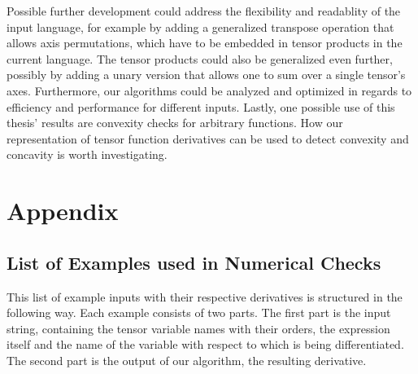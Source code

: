 \documentclass[12pt, a4paper]{report}
\begin{document}
Possible further development could address the flexibility and readablity of the input language, for example by adding a generalized transpose operation that allows axis permutations, which have to be embedded in tensor products in the current language.
The tensor products could also be generalized even further, possibly by adding a unary version that allows one to sum over a single tensor's axes.
Furthermore, our algorithms could be analyzed and optimized in regards to efficiency and performance for different inputs.
Lastly, one possible use of this thesis' results are convexity checks for arbitrary functions.
How our representation of tensor function derivatives can be used to detect convexity and concavity is worth investigating.

\printbibliography
{}

\chapter*{Appendix}
\section*{List of Examples used in Numerical Checks}
This list of example inputs with their respective derivatives is structured in the following way.
Each example consists of two parts.
The first part is the input string, containing the tensor variable names with their orders, the expression itself and the name of the variable with respect to which is being differentiated.
The second part is the output of our algorithm, the resulting derivative.
\end{document}
